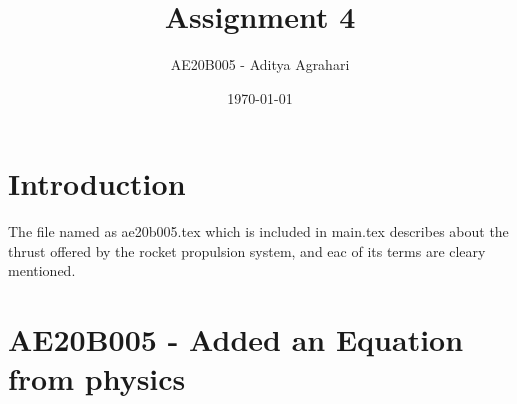 \documentclass[a4paper, 12pt]{article}
\begin{document}
\title{Assignment 4}
\author{AE20B005 - Aditya Agrahari}
\date{\today}
\maketitle

\tableofcontents

\section{Introduction}
The file named as ae20b005.tex which is included in main.tex describes about the thrust offered by the rocket propulsion system, and eac of its terms are cleary mentioned.

\section{AE20B005 - Added an Equation from physics}

\end{document}
